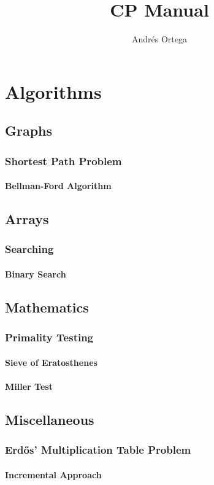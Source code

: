 \documentclass[12pt]{book}
\newcommand{\<}{\langle}
\renewcommand{\>}{\rangle}
\renewcommand{\(}{\left(}
\renewcommand{\)}{\right)}
\begin{document}
\title{CP Manual}
\author{Andrés Ortega}
\date{}

\maketitle

\tableofcontents

\chapter{Algorithms}
    \section{Graphs}
        \subsection{Shortest Path Problem}
            \subsubsection{Bellman-Ford Algorithm}
                
    \section{Arrays}
        \subsection{Searching}
            \subsubsection{Binary Search}
                

    \section{Mathematics}
        \subsection{Primality Testing}
            \subsubsection{Sieve of Eratosthenes}
                

        \subsubsection{Miller Test}
            

    \section{Miscellaneous}
        \subsection{Erdős' Multiplication Table Problem}
            \subsubsection{Incremental Approach}
                

\printbibliography
\end{document}
